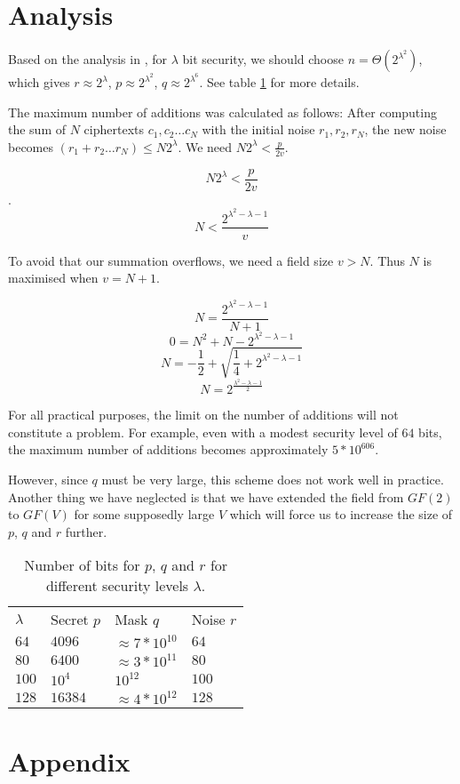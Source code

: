 \documentclass[10pt,twocolumn]{article}
\begin{document}
\section{Analysis}
Based on the analysis in \cite{dijk10}, for $\lambda$ bit security, we should choose $n = \Theta(2^{\lambda^2})$, which gives $r\approx 2^\lambda$, $p\approx2^{\lambda^2}$, $q\approx2^{\lambda^6}$. See table \ref{tab:params} for more details.

The maximum number of additions was calculated as follows: After computing the sum of $N$ ciphertexts $c_1, c_2\ldots c_N$ with the initial noise $r_1, r_2, r_N$, the new noise becomes $(r_1 + r_2\ldots r_N) \le N2^{\lambda}$. We need $N2^\lambda < \frac{p}{2v}$.

$$N2^\lambda < \frac{p}{2v}$$.
$$N < \frac{2^{\lambda^2-\lambda-1}}{v}$$

To avoid that our summation overflows, we need a field size $v > N$. Thus $N$ is maximised when $v = N + 1$.

$$N = \frac{2^{\lambda^2-\lambda-1}}{N + 1}$$
$$0 = N^2+N-2^{\lambda^2-\lambda-1}$$
$$N = -\frac{1}{2}+\sqrt{\frac{1}{4}+2^{\lambda^2-\lambda-1}}$$
$$N = 2^{\frac{\lambda^2-\lambda-1}{2}}$$

For all practical purposes, the limit on the number of additions will not constitute a problem. For example, even with a modest security level of $64$ bits, the maximum number of additions becomes approximately $5 * 10^{606}$.

However, since $q$ must be very large, this scheme does not work well in practice. Another thing we have neglected is that we have extended the field from $GF(2)$ to $GF(V)$ for some supposedly large $V$ which will force us to increase the size of $p$, $q$ and $r$ further.
\begin{table}
    \begin{tabular}{l || l | l | l}
         \textbf{$\lambda$} & Secret $p$ & Mask $q$ & Noise $r$\\
         $64$ & $4096$ & $\approx7*10^{10}$ & $64$\\
         $80$ & $6400$ & $\approx3*10^{11}$ & $80$\\
         $100$ & $10^4$ & $10^{12}$ & $100$\\
         $128$ & $16384$ & $\approx4*10^{12}$ & $128$\\
    \end{tabular}
    \caption{Number of bits for $p$, $q$ and $r$ for different security levels $\lambda$.}
    \label{tab:params}
\end{table}


\onecolumn
\newpage
\section{Appendix}
\lstset{style=tiny}

\end{document}
